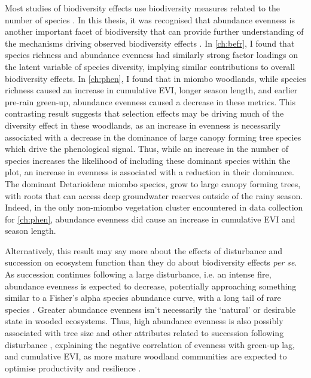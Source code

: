 \begin{refsection}
Most studies of biodiversity effects use biodiversity measures related to the number of species \citep{Tilman2014}. In this thesis, it was recognised that abundance evenness is another important facet of biodiversity that can provide further understanding of the mechanisms driving observed biodiversity effects \citep{Chalcraft2004}. In \autoref{ch:befr}, I found that species richness and abundance evenness had similarly strong factor loadings on the latent variable of species diversity, implying similar contributions to overall biodiversity effects. In \autoref{ch:phen}, I found that in miombo woodlands, while species richness caused an increase in cumulative EVI, longer season length, and earlier pre-rain green-up, abundance evenness caused a decrease in these metrics. This contrasting result suggests that selection effects may be driving much of the diversity effect in these woodlands, as an increase in evenness is necessarily associated with a decrease in the dominance of large canopy forming tree species which drive the phenological signal. Thus, while an increase in the number of species increases the likelihood of including these dominant species within the plot, an increase in evenness is associated with a reduction in their dominance. The dominant Detarioideae miombo species, grow to large canopy forming trees, with roots that can access deep groundwater reserves outside of the rainy season. Indeed, in the only non-miombo vegetation cluster encountered in data collection for \autoref{ch:phen}, abundance evenness did cause an increase in cumulative EVI and season length.

Alternatively, this result may say more about the effects of disturbance and succession on ecosystem function than they do about biodiversity effects \textit{per se}. As succession continues following a large disturbance, i.e. an intense fire, abundance evenness is expected to decrease, potentially approaching something similar to a Fisher's alpha species abundance curve, with a long tail of rare species \citep{Morozov2008, Sheil2001}. Greater abundance evenness isn't necessarily the `natural' or desirable state in wooded ecosystems. Thus, high abundance evenness is also possibly associated with tree size and other attributes related to succession following disturbance \citep{Holdo2006}, explaining the negative correlation of evenness with green-up lag, and cumulative EVI, as more mature woodland communities are expected to optimise productivity and resilience \citep{Hector2007}.


\end{refsection}
